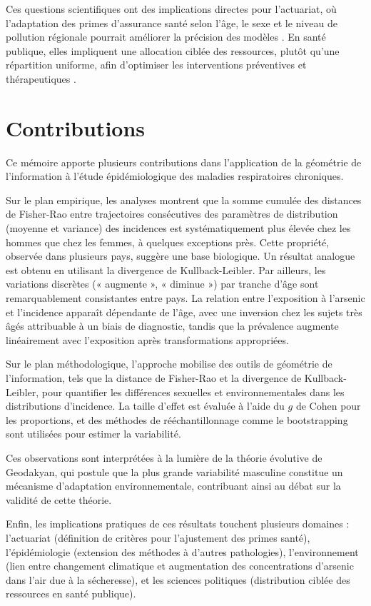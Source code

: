 Ces questions scientifiques ont des implications directes pour l'actuariat, où l'adaptation des primes d'assurance santé selon l'âge, le sexe et le niveau de pollution régionale pourrait améliorer la précision des modèles \citep{bolviken2014computation}. En santé publique, elles impliquent une allocation ciblée des ressources, plutôt qu'une répartition uniforme, afin d'optimiser les interventions préventives et thérapeutiques \citep{read2010gender}.

\section{Contributions}

Ce mémoire apporte plusieurs contributions dans l'application de la géométrie de l'information à l'étude épidémiologique des maladies respiratoires chroniques.

Sur le plan empirique, les analyses montrent que la somme cumulée des distances de Fisher-Rao entre trajectoires consécutives des paramètres de distribution (moyenne et variance) des incidences est systématiquement plus élevée chez les hommes que chez les femmes, à quelques exceptions près. Cette propriété, observée dans plusieurs pays, suggère une base biologique. Un résultat analogue est obtenu en utilisant la divergence de Kullback-Leibler. Par ailleurs, les variations discrètes (« augmente », « diminue ») par tranche d'âge sont remarquablement consistantes entre pays. La relation entre l'exposition à l'arsenic et l'incidence apparaît dépendante de l'âge, avec une inversion chez les sujets très âgés attribuable à un biais de diagnostic, tandis que la prévalence augmente linéairement avec l'exposition après transformations appropriées.

Sur le plan méthodologique, l'approche mobilise des outils de géométrie de l'information, tels que la distance de Fisher-Rao et la divergence de Kullback-Leibler, pour quantifier les différences sexuelles et environnementales dans les distributions d'incidence. La taille d'effet est évaluée à l'aide du \( g \) de Cohen pour les proportions, et des méthodes de rééchantillonnage comme le bootstrapping sont utilisées pour estimer la variabilité.

Ces observations sont interprétées à la lumière de la théorie évolutive de Geodakyan, qui postule que la plus grande variabilité masculine constitue un mécanisme d'adaptation environnementale, contribuant ainsi au débat sur la validité de cette théorie.

Enfin, les implications pratiques de ces résultats touchent plusieurs domaines : l'actuariat (définition de critères pour l'ajustement des primes santé), l'épidémiologie (extension des méthodes à d'autres pathologies), l'environnement (lien entre changement climatique et augmentation des concentrations d'arsenic dans l'air due à la sécheresse), et les sciences politiques (distribution ciblée des ressources en santé publique).

